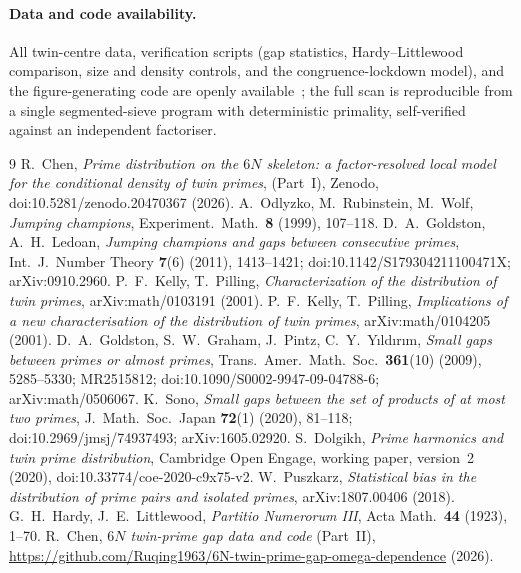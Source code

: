 \documentclass[11pt]{article}
\theoremstyle{remark}\newtheorem{remark}{Remark}
\begin{document}
\paragraph{Data and code availability.}
All twin-centre data, verification scripts (gap statistics, Hardy--Littlewood
comparison, size and density controls, and the congruence-lockdown model), and
the figure-generating code are openly available~\cite{repo2}; the full scan is
reproducible from a single segmented-sieve program with deterministic primality,
self-verified against an independent factoriser.

\begin{thebibliography}{9}
 R.~Chen, \emph{Prime distribution on the $6N$ skeleton: a
factor-resolved local model for the conditional density of twin primes}, (Part~I),
Zenodo, doi:10.5281/zenodo.20470367 (2026).
 A.~Odlyzko, M.~Rubinstein, M.~Wolf, \emph{Jumping champions},
Experiment.\ Math.\ \textbf{8} (1999), 107--118.
 D.~A.~Goldston, A.~H.~Ledoan, \emph{Jumping champions and gaps
between consecutive primes}, Int.\ J.\ Number Theory \textbf{7}(6) (2011),
1413--1421; doi:10.1142/S179304211100471X; arXiv:0910.2960.
 P.~F.~Kelly, T.~Pilling, \emph{Characterization of the
distribution of twin primes}, arXiv:math/0103191 (2001).
 P.~F.~Kelly, T.~Pilling, \emph{Implications of a new
characterisation of the distribution of twin primes}, arXiv:math/0104205 (2001).
 D.~A.~Goldston, S.~W.~Graham, J.~Pintz, C.~Y.~Yıldırım,
\emph{Small gaps between primes or almost primes}, Trans.\ Amer.\ Math.\ Soc.\
\textbf{361}(10) (2009), 5285--5330; MR2515812; doi:10.1090/S0002-9947-09-04788-6;
arXiv:math/0506067.
 K.~Sono, \emph{Small gaps between the set of products of at most
two primes}, J.\ Math.\ Soc.\ Japan \textbf{72}(1) (2020), 81--118;
doi:10.2969/jmsj/74937493; arXiv:1605.02920.
 S.~Dolgikh, \emph{Prime harmonics and twin prime
distribution}, Cambridge Open Engage, working paper, version~2 (2020),
doi:10.33774/coe-2020-c9x75-v2.
\bibitem{Pusz} W.~Puszkarz, \emph{Statistical bias in the distribution of prime
pairs and isolated primes}, arXiv:1807.00406 (2018).
 G.~H.~Hardy, J.~E.~Littlewood, \emph{Partitio Numerorum III}, Acta
Math.\ \textbf{44} (1923), 1--70.
 R.~Chen, \emph{$6N$ twin-prime gap data and code} (Part~II),
\url{https://github.com/Ruqing1963/6N-twin-prime-gap-omega-dependence} (2026).
\end{thebibliography}
\end{document}
